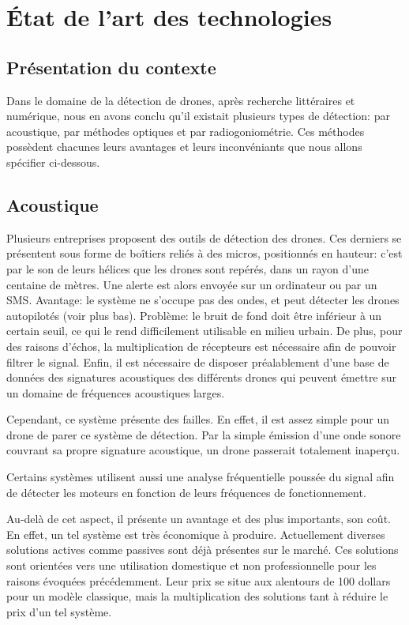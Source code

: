 
\chapter{État de l'art des technologies}

\section{Présentation du contexte}

Dans le domaine de la détection de drones, après recherche littéraires et numérique, nous en avons conclu qu'il existait plusieurs types de détection: par acoustique, par méthodes optiques et par radiogoniométrie.
Ces méthodes possèdent chacunes leurs avantages et leurs inconvéniants que nous allons spécifier ci-dessous.


\section{Acoustique}

Plusieurs entreprises proposent des outils de détection des drones. Ces derniers se présentent sous forme de boîtiers reliés à des micros, positionnés en hauteur: c'est par le son de leurs hélices que les drones sont repérés, dans un rayon d'une centaine de mètres. Une alerte est alors envoyée sur un ordinateur ou par un SMS. Avantage: le système ne s'occupe pas des ondes, et peut détecter les drones autopilotés (voir plus bas). Problème: le bruit de fond doit être inférieur à un certain seuil, ce qui le rend difficilement utilisable en milieu urbain. De plus, pour des raisons d'échos, la multiplication de récepteurs est nécessaire afin de pouvoir filtrer le signal. Enfin, il est nécessaire de disposer préalablement d'une base de données des signatures acoustiques des différents drones qui peuvent émettre sur un domaine de fréquences acoustiques larges.

Cependant, ce système présente des failles. En effet, il est assez simple pour un drone de parer ce système de détection. Par la simple émission d'une onde sonore couvrant sa propre signature acoustique, un drone passerait totalement inaperçu.

Certains systèmes utilisent aussi une analyse fréquentielle poussée du signal afin de détecter les moteurs en fonction de leurs fréquences de fonctionnement.

Au-delà de cet aspect, il présente un avantage et des plus importants, son coût. En effet, un tel système est très économique à produire. Actuellement diverses solutions actives comme passives sont déjà présentes sur le marché. Ces solutions sont orientées vers une utilisation domestique et non professionnelle pour les raisons évoquées précédemment. Leur prix se situe aux alentours de 100 dollars pour un modèle classique, mais la multiplication des solutions tant à réduire le prix d'un tel système. 

